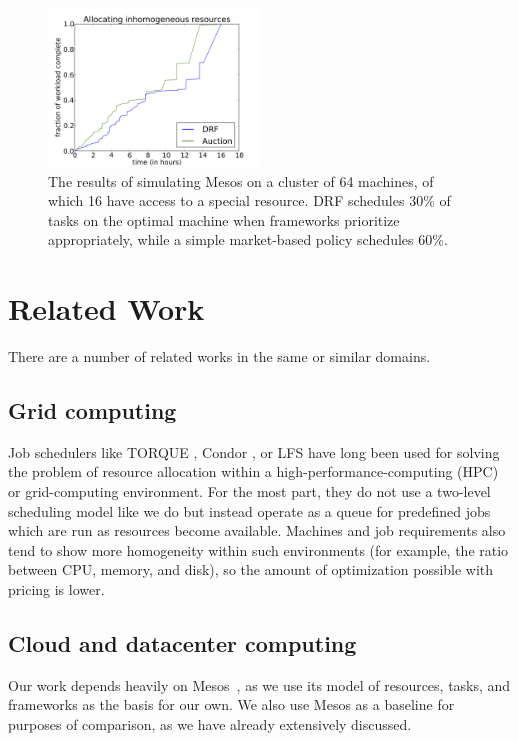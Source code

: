 \documentclass{acm_proc_article-sp}
\begin{document}
\begin{figure}
\includegraphics[width=0.5\textwidth]{images/inhomo_times.png}
\caption{The results of simulating Mesos on a cluster of 64 machines, of which 16 have access to a special resource. DRF schedules 30\% of tasks on the optimal machine when frameworks prioritize appropriately, while a simple market-based policy schedules 60\%.}
\label{img:inhomo}
\end{figure}


\section{Related Work}
\label{sec:related}

There are a number of related works in the same or similar domains.

\subsection{Grid computing}
Job schedulers like TORQUE \cite{torque}, Condor \cite{condor}, or LFS \cite{LFS} have long been used for solving the problem of resource allocation
within a high-performance-computing (HPC) or grid-computing environment.
For the most part, they do not use a two-level scheduling model like we do but
instead operate as a queue for predefined jobs which are run as resources become
available. Machines and job requirements also tend to show more homogeneity
within such environments (for example, the ratio between CPU, memory, and disk),
so the amount of optimization possible with pricing is lower.

\subsection{Cloud and datacenter computing}
Our work depends heavily on Mesos~\cite{mesos}, as we use its model of
resources, tasks, and frameworks as the basis for our own. We also use Mesos as
a baseline for purposes of comparison, as we have already extensively discussed.
\end{document}
